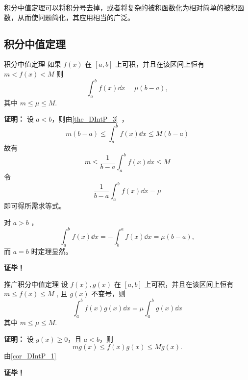 
\begin{issues}
\issueDraft
\end{issues}

积分中值定理可以将积分号去掉，或者将复杂的被积函数化为相对简单的被积函数，从而使问题简化，其应用相当的广泛。

\subsection{积分中值定理}
\begin{theorem}{积分中值定理}
如果 $f(x)$ 在 $[a,b]$ 上可积，并且在该区间上恒有$m<f(x)<M$
则
\begin{equation}
\int_a^b f(x)\dd x=\mu(b-a),
\end{equation}
其中 $m\leq\mu\leq M.$
\end{theorem}

\textbf{证明：}
设 $a<b$，则由\autoref{the_DIntP_3}~，
\begin{equation}
m(b-a)\leq\int_a^b f(x)\dd x\leq M(b-a)
\end{equation}
故有
\begin{equation}
m\leq\frac{1}{b-a}\int_a^b f(x)\dd x\leq M
\end{equation}
令
\begin{equation}
\frac{1}{b-a}\int_a^b f(x)\dd x=\mu
\end{equation}
即可得所需求等式。

对 $a>b$ ，
\begin{equation}
\int_a^b f(x)\dd x=-\int_b^a f(x)\dd x=\mu(b-a),
\end{equation}
而 $a=b$ 时定理显然。 

\textbf{证毕！}

\begin{theorem}{推广积分中值定理}
设 $f(x),g(x)$ 在 $[a,b]$ 上可积，并且在该区间上恒有$m\leq f(x)\leq M$
, 且 $g(x)$ 不变号，则
\begin{equation}
\int_a^b f(x)g(x)\dd x=\mu\int_a^b g(x)\dd x
\end{equation}
其中 $m\leq\mu\leq M.$
\end{theorem}
\textbf{证明：}
设 $g(x)\geq 0$，且 $a<b$，则
\begin{equation}
mg(x)\leq f(x)g(x)\leq Mg(x).
\end{equation}
由\autoref{cor_DIntP_1}~

\textbf{证毕！}